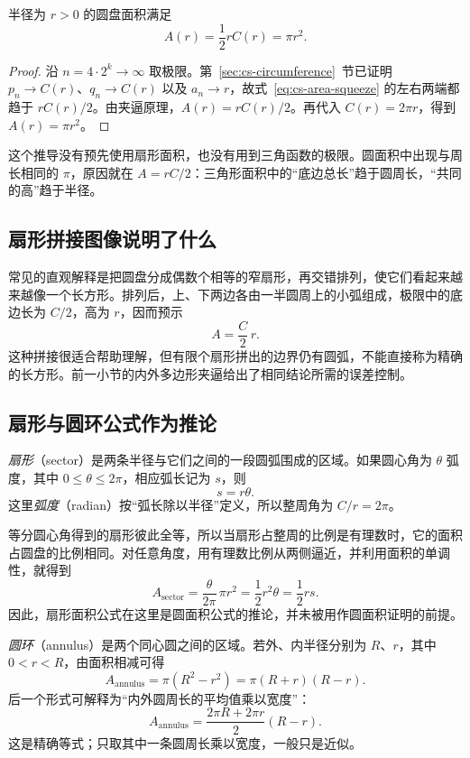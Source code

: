 \documentclass[UTF8,12pt,a4paper,fontset=fandol]{ctexart}
\begin{document}
\begin{theorem}[圆盘面积]
半径为 $r>0$ 的圆盘面积满足
\begin{equation}\label{eq:cs-circle-area}
  \boxed{A(r)=\frac12rC(r)=\pi r^2}.
\end{equation}
\end{theorem}

\begin{proof}
沿 $n=4\cdot2^k\to\infty$ 取极限。第~\ref{sec:cs-circumference}~节已证明 $p_n\to C(r)$、$q_n\to C(r)$ 以及 $a_n\to r$，故式~\eqref{eq:cs-area-squeeze} 的左右两端都趋于 $rC(r)/2$。由夹逼原理，$A(r)=rC(r)/2$。再代入 $C(r)=2\pi r$，得到 $A(r)=\pi r^2$。
\end{proof}

这个推导没有预先使用扇形面积，也没有用到三角函数的极限。圆面积中出现与周长相同的 $\pi$，原因就在 $A=rC/2$：三角形面积中的“底边总长”趋于圆周长，“共同的高”趋于半径。

\subsection{扇形拼接图像说明了什么}

常见的直观解释是把圆盘分成偶数个相等的窄扇形，再交错排列，使它们看起来越来越像一个长方形。排列后，上、下两边各由一半圆周上的小弧组成，极限中的底边长为 $C/2$，高为 $r$，因而预示
\[
  A=\frac C2\,r.
\]
这种拼接很适合帮助理解，但有限个扇形拼出的边界仍有圆弧，不能直接称为精确的长方形。前一小节的内外多边形夹逼给出了相同结论所需的误差控制。

\subsection{扇形与圆环公式作为推论}

\emph{扇形}（sector）是两条半径与它们之间的一段圆弧围成的区域。如果圆心角为 $\theta$ 弧度，其中 $0\leq\theta\leq2\pi$，相应弧长记为 $s$，则
\[
  s=r\theta.
\]
这里\emph{弧度}（radian）按“弧长除以半径”定义，所以整周角为 $C/r=2\pi$。

等分圆心角得到的扇形彼此全等，所以当扇形占整周的比例是有理数时，它的面积占圆盘的比例相同。对任意角度，用有理数比例从两侧逼近，并利用面积的单调性，就得到
\begin{equation}\label{eq:cs-sector}
  A_{\mathrm{sector}}
  =\frac{\theta}{2\pi}\,\pi r^2
  =\frac12r^2\theta
  =\frac12rs.
\end{equation}
因此，扇形面积公式在这里是圆面积公式的推论，并未被用作圆面积证明的前提。

\emph{圆环}（annulus）是两个同心圆之间的区域。若外、内半径分别为 $R$、$r$，其中 $0<r<R$，由面积相减可得
\begin{equation}\label{eq:cs-annulus}
  A_{\mathrm{annulus}}=\pi(R^2-r^2)=\pi(R+r)(R-r).
\end{equation}
后一个形式可解释为“内外圆周长的平均值乘以宽度”：
\[
  A_{\mathrm{annulus}}=\frac{2\pi R+2\pi r}{2}(R-r).
\]
这是精确等式；只取其中一条圆周长乘以宽度，一般只是近似。
\end{document}
